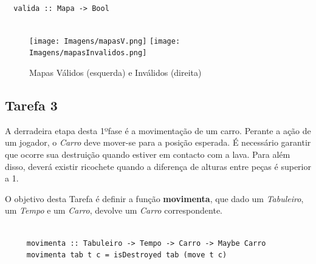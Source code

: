 \documentclass[a4paper]{report} %
\begin{document}
 \begin{verbatim}
    
  valida :: Mapa -> Bool
 
 \end{verbatim}

 \begin{figure}[!h]
 \begin{center}
  
  \texttt{[image: Imagens/mapasV.png]} \quad
  \texttt{[image: Imagens/mapasInvalidos.png]}
  \caption{Mapas Válidos (esquerda) e Inválidos (direita)} 
 
 \end{center}
 \end{figure}

 
 
\newpage
 
 \subsection{Tarefa 3}
 
 A derradeira etapa desta 1ºfase é a movimentação de um carro. Perante a ação de um jogador, o \emph{Carro} deve mover-se para a posição esperada. É necessário garantir que ocorre sua destruição quando estiver em contacto com a lava. Para além disso, deverá existir ricochete quando a diferença de alturas entre peças é superior a 1.
 
 O objetivo desta Tarefa é definir a função \textbf{movimenta}, que dado um \emph{Tabuleiro}, um \emph{Tempo} e um \emph{Carro},  devolve um \emph{Carro} correspondente. 

\begin{verbatim}
    
     movimenta :: Tabuleiro -> Tempo -> Carro -> Maybe Carro
     movimenta tab t c = isDestroyed tab (move t c)

\end{verbatim}
\end{document}
